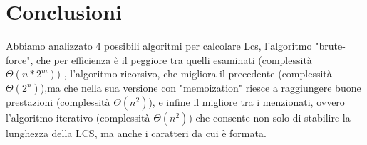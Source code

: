 \documentclass[11pt,a4paper]{article}
\begin{document}
\section{Conclusioni}
Abbiamo analizzato 4 possibili algoritmi per calcolare Lcs, l'algoritmo "brute-force", che per efficienza è il peggiore tra quelli esaminati (complessità $\Theta(n*2^m)$) , l'algoritmo ricorsivo, che migliora il precedente (complessità $\Theta(2^n)$),ma che nella sua versione con "memoization" riesce a raggiungere buone prestazioni (complessità $\Theta(n^2)$), e infine il migliore tra i menzionati, ovvero l'algoritmo iterativo (complessità $\Theta(n^2)$) che consente non solo di stabilire la lunghezza della LCS, ma anche i caratteri da cui è formata.
\end{document}
